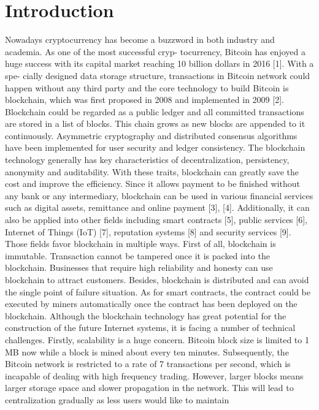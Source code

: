 \documentclass[conference]{IEEEtran}
\begin{document}
\section{Introduction}
Nowadays cryptocurrency has become a buzzword in both
industry and academia. As one of the most successful cryp-
tocurrency, Bitcoin has enjoyed a huge success with its capital
market reaching 10 billion dollars in 2016 [1]. With a spe-
cially designed data storage structure, transactions in Bitcoin
network could happen without any third party and the core
technology to build Bitcoin is blockchain, which was first
proposed in 2008 and implemented in 2009 [2]. Blockchain
could be regarded as a public ledger and all committed
transactions are stored in a list of blocks. This chain grows
as new blocks are appended to it continuously. Asymmetric
cryptography and distributed consensus algorithms have been
implemented for user security and ledger consistency. The
blockchain technology generally has key characteristics of
decentralization, persistency, anonymity and auditability. With
these traits, blockchain can greatly save the cost and improve
the efficiency.
Since it allows payment to be finished without any bank or
any intermediary, blockchain can be used in various financial
services such as digital assets, remittance and online payment
[3], [4]. Additionally, it can also be applied into other fields
including smart contracts [5], public services [6], Internet of
Things (IoT) [7], reputation systems [8] and security services
[9]. Those fields favor blockchain in multiple ways. First of all,
blockchain is immutable. Transaction cannot be tampered once
it is packed into the blockchain. Businesses that require high
reliability and honesty can use blockchain to attract customers.
Besides, blockchain is distributed and can avoid the single
point of failure situation. As for smart contracts, the contract
could be executed by miners automatically once the contract
has been deployed on the blockchain.
Although the blockchain technology has great potential for
the construction of the future Internet systems, it is facing a
number of technical challenges. Firstly, scalability is a huge
concern. Bitcoin block size is limited to 1 MB now while
a block is mined about every ten minutes. Subsequently, the
Bitcoin network is restricted to a rate of 7 transactions per
second, which is incapable of dealing with high frequency
trading. However, larger blocks means larger storage space
and slower propagation in the network. This will lead to
centralization gradually as less users would like to maintain
\end{document}
